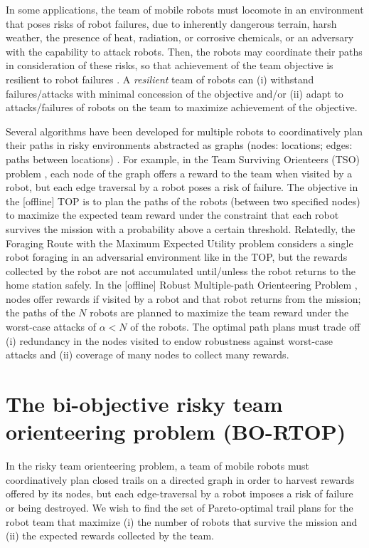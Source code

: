 \documentclass[11pt, oneside]{article}
\begin{document}
In some applications, the team of mobile robots must locomote in an environment that poses risks of robot failures, due to inherently dangerous terrain, harsh weather, the presence of heat, radiation, or corrosive chemicals, or an adversary with the capability to attack robots. Then, the robots may coordinate their paths in consideration of these risks, so that achievement of the team objective is resilient to robot failures \cite{zhou2021multi}. A \emph{resilient} team of robots can (i) withstand failures/attacks with minimal concession of the objective and/or (ii) adapt to attacks/failures of robots on the team to maximize achievement of the objective. 

Several algorithms have been developed for multiple robots to coordinatively plan their paths in risky environments abstracted as graphs (nodes: locations; edges: paths between locations) \cite{jorgensen2018team,shi2023robust,zhou2022distributed}. 
For example, in the Team Surviving Orienteers (TSO) problem \cite{jorgensen2018team}, each node of the graph offers a reward to the team when visited by a robot, but each edge traversal by a robot poses a risk of failure. The objective in the [offline] TOP is to plan the paths of the robots (between two specified nodes) to maximize the expected team reward under the constraint that each robot survives the mission with a probability above a certain threshold. 
Relatedly, the Foraging Route with the Maximum Expected Utility problem \cite{di2022foraging} considers a single robot foraging in an adversarial environment like in the TOP, but the rewards collected by the robot are not accumulated until/unless the robot returns to the home station safely.
In the [offline] Robust Multiple-path Orienteering Problem \cite{shi2023robust}, nodes offer rewards if visited by a robot and that robot returns from the mission; the paths of the $N$ robots are planned to maximize the team reward under the worst-case attacks of $\alpha<N$ of the robots. The optimal path plans must trade off (i) redundancy in the nodes visited to endow robustness against worst-case attacks and (ii) coverage of many nodes to collect many rewards.



\section{The bi-objective risky team orienteering problem (BO-RTOP)}
In the risky team orienteering problem, a team of mobile robots must coordinatively plan closed trails on a directed graph in order to harvest rewards offered by its nodes, but each edge-traversal by a robot imposes a risk of failure or being destroyed. 
We wish to find the set of Pareto-optimal trail plans for the robot team that maximize (i) the number of robots that survive the mission and (ii) the expected rewards collected by the team.
\end{document}
